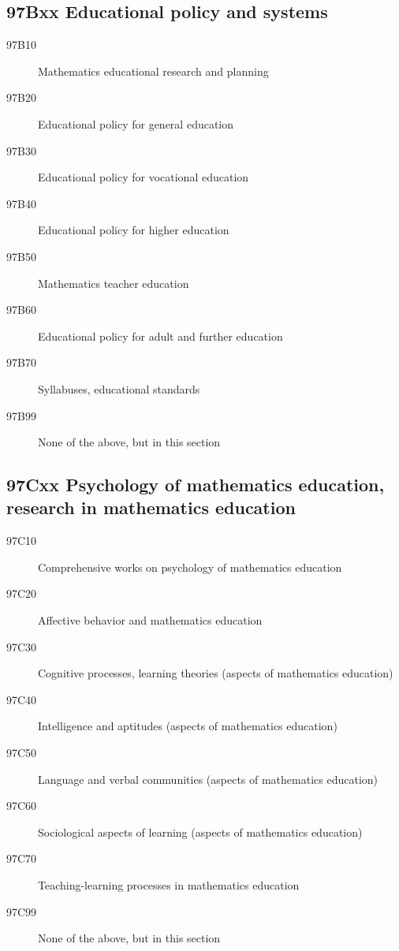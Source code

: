 \subsection*{97Bxx  Educational policy and systems }\label{97Bxx}
\begin{description}  
\item [97B10]\label{97B10} Mathematics educational research and planning
\item [97B20]\label{97B20} Educational policy for general education
\item [97B30]\label{97B30} Educational policy for vocational education
\item [97B40]\label{97B40} Educational policy for higher education
\item [97B50]\label{97B50} Mathematics teacher education
\item [97B60]\label{97B60} Educational policy for adult and further education
\item [97B70]\label{97B70} Syllabuses, educational standards
\item [97B99]\label{97B99} None of the above, but in this section
\end{description}
\subsection*{97Cxx  Psychology of mathematics education, research in mathematics education }\label{97Cxx}
\begin{description}  
\item [97C10]\label{97C10} Comprehensive works on psychology of mathematics education
\item [97C20]\label{97C20} Affective behavior and mathematics education
\item [97C30]\label{97C30} Cognitive processes, learning theories (aspects of mathematics education)
\item [97C40]\label{97C40} Intelligence and aptitudes (aspects of mathematics education)
\item [97C50]\label{97C50} Language and verbal communities (aspects of mathematics education)
\item [97C60]\label{97C60} Sociological aspects of learning (aspects of mathematics education)
\item [97C70]\label{97C70} Teaching-learning processes in mathematics education
\item [97C99]\label{97C99} None of the above, but in this section
\end{description}
